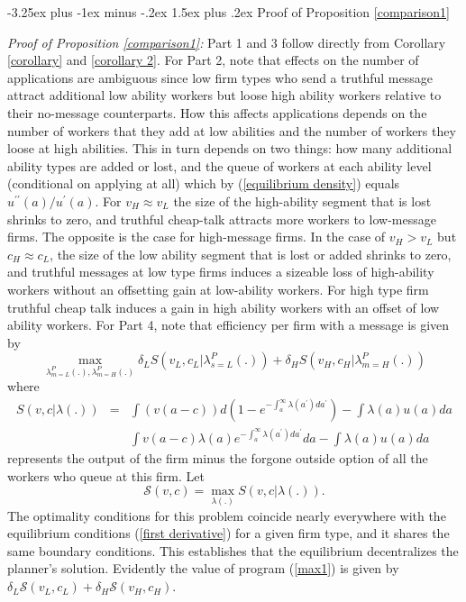 \documentclass[12pt]{article}
\makeatletter
\renewcommand{\subsection}{%
  \@startsection{subsection}{2}{\z@}%
  {-3.25ex plus -1ex minus -.2ex}%
  {1.5ex plus .2ex}%
  {\normalfont\large\bfseries}%
}
\makeatother
\begin{document}
\subsection{Proof of Proposition \ref{comparison1}}\label{online_app:proof_comparison}

\noindent \textit{Proof of Proposition \ref{comparison1}:} Part 1 and 3 follow
directly from Corollary \ref{corollary} and \ref{corollary 2}. For Part 2, note
that effects on the number of applications are ambiguous since low firm
types who send a truthful message attract additional low ability workers but loose high ability workers relative to their no-message counterparts.
How this affects applications depends on the number of workers that they add at low abilities and the number of workers they loose at high abilities. This in turn depends on two things: how many additional ability types are added or lost, and the queue of workers at each ability level (conditional on applying at all) which by
(\ref{equilibrium density}) equals $u^{\prime \prime }(a)/u^{\prime }(a)$. For $v_{H}\approx v_{L}$ the size of the high-ability segment that is lost shrinks to zero, and
truthful cheap-talk attracts more workers to low-message firms. The opposite
is the case for high-message firms. In the case of $v_{H}> v_L$ but $c_H \approx c_L$, the size of the low ability segment that is lost or added shrinks to zero, and truthful messages at low type firms induces a sizeable loss of high-ability workers without an offsetting gain at low-ability workers. For high type firm truthful cheap talk induces a gain in high ability workers with an offset of low ability workers. For Part 4, note that efficiency per firm with a message is given by 
\begin{equation}
\max_{\lambda _{m=L}^{P}(.),\lambda _{m=H}^{P}(.)}\delta
_{L}S(v_{L},c_{L}|\lambda _{s=L}^{P}(.))+\delta _{H}S(v_{H},c_{H}|\lambda
_{m=H}^{P}(.))  \label{max1}
\end{equation}%
where 
\begin{eqnarray*}
S(v,c|\lambda (.)) &=&\int \left( v(a-c)\right) d\left(
1-e^{-\int_{a}^{\infty }\lambda (a^{\prime })da^{\prime }}\right) -\int
\lambda (a)u(a)da \\
&&\int v(a-c)\lambda (a)e^{-\int_{a}^{\infty }\lambda (a^{\prime
})da^{\prime }}da-\int \lambda (a)u(a)da
\end{eqnarray*}%
represents the output of the firm minus the forgone outside option of all
the workers who queue at this firm. Let 
\begin{equation}
\mathcal{S}(v,c)=\max_{\lambda (.)}S(v,c|\lambda (.)).  \label{max-by-type}
\end{equation}%
The optimality conditions for this problem coincide nearly everywhere with
the equilibrium conditions (\ref{first derivative}) for a given firm type,
and it shares the same boundary conditions. This establishes that the
equilibrium decentralizes the planner's solution. Evidently the value of
program (\ref{max1}) is given by $\delta _{L}\mathcal{S}(v_{L},c_{L})+\delta
_{H}\mathcal{S}(v_{H},c_{H}).$
\end{document}
